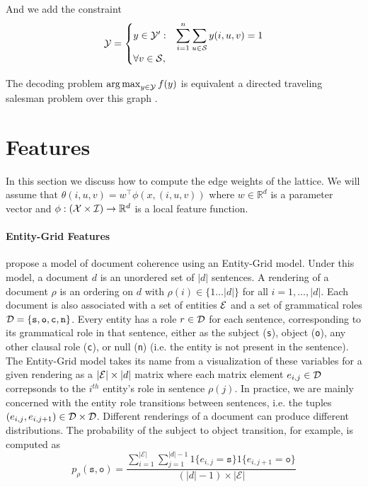 \documentclass[11pt]{article}
\newcommand{\Structs}{{\cal Y}}
\newcommand{\IndexSet}{{\cal I}}
\newcommand{\Sents}{{\cal S}}
\newcommand{\Enum}[1]{\{ 1 \ldots #1 \}}
\newcommand{\Reals}{{\mathbb R}}
\newcommand{\Ents}{{\cal E}}
\newcommand{\Roles}{{\cal D}}
\newcommand{\Role}{r}
\newcommand{\Doc}{d}
\newcommand{\rend}{\rho}
\DeclareMathOperator*{\argmax}{arg\,max}
\begin{document}
And we add the constraint 
\[\Structs = \begin{cases} y\in\Structs' :  & \displaystyle \sum_{i = 1}^n \sum_{u\in \Sents} y(i, u,v)  = 1 \\  \forall v \in \Sents, \end{cases} \]



The decoding problem $\argmax_{y \in \Structs} f(y)$ is equivalent a directed traveling salesman problem over this graph \cite{}. 









\section{Features}

In this section we discuss how to compute the edge weights of the lattice. We will assume that $\theta(i, u, v) = w^\top \phi(x, (i, u, v))$ where $w \in \Reals^{d}$ is a parameter vector and $\phi: ({\cal X} \times \IndexSet) \rightarrow \Reals^{d}$ is a local feature function. 

\paragraph{Entity-Grid Features}

 propose a model of document coherence using an Entity-Grid model. Under this model, a document $\Doc$ is an unordered set of $|\Doc|$ sentences. A rendering of a document $\rend$ is an ordering on $d$ with $\rend(i) \in \Enum{|d|}$ for all $i = 1,\ldots,|\Doc|$.
Each document is also associated with a set of entities $\Ents$ and a set of grammatical roles  $\Roles = \{\texttt{s}, \texttt{o}, \texttt{c}, \texttt{n} \}$.
Every entity has a role $\Role \in \Roles$ for each sentence, corresponding to its grammatical role in that sentence, either as the subject (\texttt{s}), object (\texttt{o}), any other clausal role (\texttt{c}), or null (\texttt{n}) (i.e. the entity is not present in the sentence).
The Entity-Grid model takes its name from a visualization of these variables for a given rendering as a $ |\Ents| \times |\Doc|$ matrix where each matrix element $e_{i,j} \in \Roles$ correpsonds to the $i^{th}$ entity's role in sentence $\rend(j)$.
In practice, we are mainly concerned with the entity role transitions between sentences, i.e. the tuples $(e_{i,j}, e_{i,j+1}) \in \Roles \times \Roles$.
Different renderings of a document can produce different distributions.
The probability of the subject to object transition, for example, is computed as 
\[\displaystyle p_\rend(\texttt{s}, \texttt{o}) = \frac{ \sum_{i=1}^{|\mathcal{E}|} \sum_{j=1}^{|d|-1} 1\{e_{i,j} = \texttt{s}\} 1\{e_{i,j+1} = \texttt{o}\}  }{(|d|-1) \times |\mathcal{E}|} \]
\end{document}
